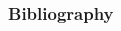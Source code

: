 \documentclass{beamer}
\begin{document}
\begin{frame}[allowframebreaks]
  \frametitle<presentation>{Bibliography}
    
  \begin{thebibliography}{10}


  
  

  \end{thebibliography}
\end{frame}
\end{document}
